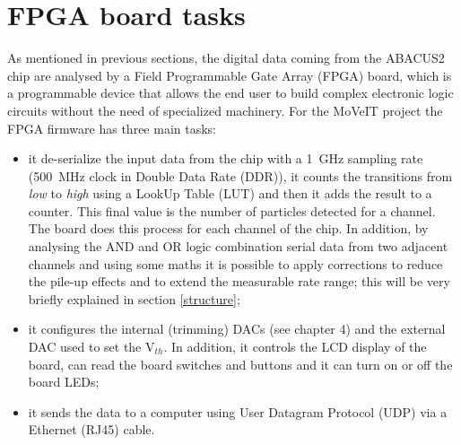 \section{FPGA board tasks}
\noindent As mentioned in previous sections, the digital data coming from the ABACUS2 chip are analysed by a Field Programmable Gate Array (FPGA) board, which is a programmable device that allows the end user to build complex electronic logic circuits without the need of specialized machinery.
For the MoVeIT project the FPGA firmware has three main tasks: 
\begin{itemize}
	\item it de-serialize the input data from the chip with a 1~GHz sampling rate (500~MHz clock in Double Data Rate (DDR)), it counts the transitions from \textit{low} to \textit{high} using a LookUp Table (LUT) and then it adds the result to a counter.
	This final value is the number of particles detected for a channel.
	The board does this process for each channel of the chip.
	In addition, by analysing the AND and OR logic combination serial data from two adjacent channels and using some maths it is possible to apply corrections to reduce the pile-up effects and to extend the measurable rate range; this will be very briefly explained in section \ref{structure};
	\item it configures the internal (trimming) DACs (see chapter 4) and the external DAC used to set the V$_{th}$.
	In addition, it controls the LCD display of the board, can read the board switches and buttons and it can turn on or off the board LEDs;
	\item it sends the data to a computer using User Datagram Protocol (UDP) via a Ethernet (RJ45) cable.  
\end{itemize}
















